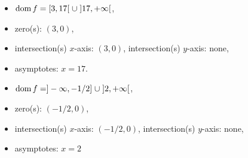 \begin{Answer}
	\Question 
	    \begin{itemize}
	    \item $\text{dom}{\,} f= [3,17[ \; \cup \; ]17,+\infty[$,
	    \item zero(s): $(3,0)$,
	    \item intersection(s) $x$-axis:  $(3,0)$, \; intersection(s) $y$-axis: none,
	    \item asymptotes: $x=17$.
	    \end{itemize}
    \Question 
	    \begin{itemize}
	    \item $\text{dom}{\,} f= ]-\infty,-1/2]\; \cup\; ]2,+\infty[$,
	    \item zero(s): $(-1/2,0)$,
	    \item intersection(s) $x$-axis: $(-1/2,0)$, \; intersection(s) $y$-axis: none,
	    \item asymptotes: $x=2$
	    \end{itemize}
\end{Answer}
 
